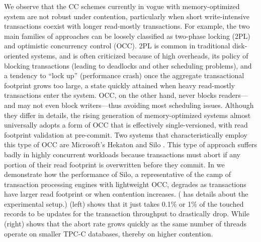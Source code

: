 We observe that the CC schemes currently in vogue with memory-optimized system are not robust under contention, particularly when short write-intensive transactions coexist with longer read-mostly transactions.
For example, the two main families of approaches can be loosely classified as two-phase locking (2PL) and optimistic concurrency control (OCC). 2PL is common in traditional disk-oriented systems, and is often criticized because of high overheads, its policy of blocking transactions (leading to deadlocks and other scheduling problems), and a tendency to ``lock up'' (performance crash) once the aggregate transactional footprint grows too large, a state quickly attained when heavy read-mostly transactions enter the system. OCC, on the other hand, never blocks readers---and may not even block writers---thus avoiding most scheduling issues. Although they differ in details, the rising generation of memory-optimized systems almost universally adopts a form of OCC that is effectively single-versioned, with read footprint validation at pre-commit.  Two systems that characteristically employ this type of OCC are Microsoft's Hekaton \cite{LarsonBDFPZ11} and Silo \cite{TuZKLM13}. This type of approach suffers badly in highly concurrent workloads \cite{YuBPDS14} because transactions must abort if any portion of their read footprint is overwritten before they commit. 
In  we demonstrate how the performance of Silo, a representative of the camp of transaction processing engines with lightweight OCC, degrades as transactions have larger read footprint or when contention increases. ( has details about the experimental setup.) (left) shows that it just takes 0.1\% or 1\% of the touched records to be updates for the transaction throughput to drastically drop. While (right) shows that the abort rate grows quickly as the same number of threads operate on smaller TPC-C databases, thereby on higher contention.


